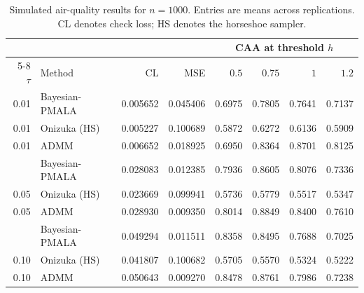 \begin{table}[H]
\centering
\small
\setlength{\tabcolsep}{4pt}
\caption{Simulated air-quality results for $n=1000$. Entries are means across replications. CL denotes check loss; HS denotes the horseshoe sampler.}
\label{tab:air_n1000}
\begin{tabular}{@{}rlrrrrrr@{}}
\toprule
 & & & & \multicolumn{4}{c}{CAA at threshold $h$} \\
\cmidrule(lr){5-8}
$\tau$ & Method & CL & MSE & $0.5$ & $0.75$ & $1$ & $1.2$ \\
\midrule
0.01 & Bayesian-PMALA & 0.005652 & 0.045406 & 0.6975 & 0.7805 & 0.7641 & 0.7137 \\
0.01 & Onizuka (HS) & 0.005227 & 0.100689 & 0.5872 & 0.6272 & 0.6136 & 0.5909 \\
0.01 & ADMM & 0.006652 & 0.018925 & 0.6950 & 0.8364 & 0.8701 & 0.8125 \\
\addlinespace[3pt]
0.05 & Bayesian-PMALA & 0.028083 & 0.012385 & 0.7936 & 0.8605 & 0.8076 & 0.7336 \\
0.05 & Onizuka (HS) & 0.023669 & 0.099941 & 0.5736 & 0.5779 & 0.5517 & 0.5347 \\
0.05 & ADMM & 0.028930 & 0.009350 & 0.8014 & 0.8849 & 0.8400 & 0.7610 \\
\addlinespace[3pt]
0.10 & Bayesian-PMALA & 0.049294 & 0.011511 & 0.8358 & 0.8495 & 0.7688 & 0.7025 \\
0.10 & Onizuka (HS) & 0.041807 & 0.100682 & 0.5705 & 0.5570 & 0.5324 & 0.5222 \\
0.10 & ADMM & 0.050643 & 0.009270 & 0.8478 & 0.8761 & 0.7986 & 0.7238 \\
\bottomrule
\end{tabular}
\end{table}

